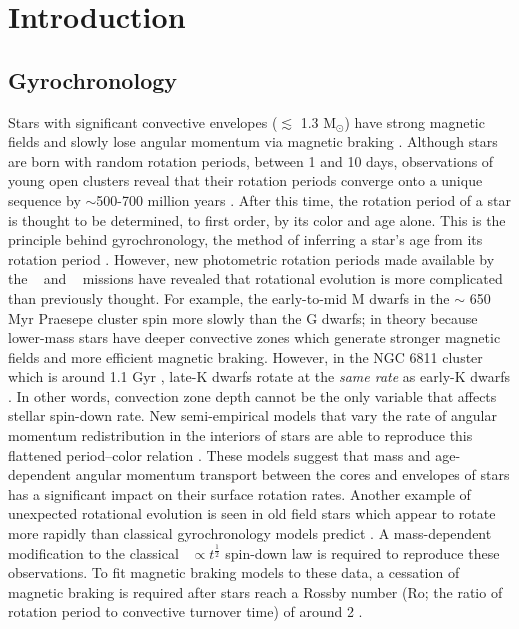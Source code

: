 \section{Introduction}

\subsection{Gyrochronology}

Stars with significant convective envelopes ($\lesssim$ 1.3 M$_\odot$) have
strong magnetic fields and slowly lose angular momentum via magnetic braking
\citep[\eg][]{schatzman1962, weber1967, skumanich1972, kawaler1988,
pinsonneault1989}.
Although stars are born with random rotation periods, between 1 and 10 days,
observations of young open clusters reveal that their rotation periods
converge onto a unique sequence by $\sim$500-700 million years
\citep[\eg][]{irwin2009, gallet2013}.
After this time, the rotation period of a star is thought to be determined, to
first order, by its color and age alone.
This is the principle behind gyrochronology, the method of inferring a
star’s age from its rotation period \citep[\eg][]{barnes2003, barnes2007,
barnes2010, meibom2011, meibom2015}.
However, new photometric rotation periods made available by the \kepler\
\citep{borucki2010} and \ktwo\ \citep{howell2014} missions
\citep[\eg][]{mcquillan2014, garcia2014, douglas2017, rebull2017, meibom2011,
meibom2015, curtis2019} have revealed that rotational evolution is more
complicated than previously thought.
For example, the early-to-mid M dwarfs in the $\sim$ 650 Myr Praesepe cluster
spin more slowly than the G dwarfs; in theory because lower-mass stars have
deeper convective zones which generate stronger magnetic fields and more
efficient magnetic braking.
However, in the NGC 6811 cluster which is around 1.1 Gyr \citep{janes2011},
late-K dwarfs rotate at the {\it same rate} as early-K dwarfs
\citep{curtis2019}.
In other words, convection zone depth cannot be the only variable that affects
stellar spin-down rate.
New semi-empirical models that vary the rate of angular momentum
redistribution in the interiors of stars are able to reproduce this flattened
period--color relation \citep{spada2019}.
These models suggest that mass and age-dependent angular momentum transport
between the cores and envelopes of stars has a significant impact on their
surface rotation rates.
Another example of unexpected rotational evolution is seen in old field stars
which appear to rotate more rapidly than classical gyrochronology models
predict \citep{angus2015, vansaders2016, vansaders2018, metcalfe2019}.
A mass-dependent modification to the classical \prot\ $\propto
t^{\frac{1}{2}}$ spin-down law \citep{skumanich1972} is required to reproduce
these observations.
To fit magnetic braking models to these data, a cessation of magnetic braking
is required after stars reach a Rossby number (Ro; the ratio of rotation
period to convective turnover time) of around 2 \citep{vansaders2016,
vansaders2018}.

